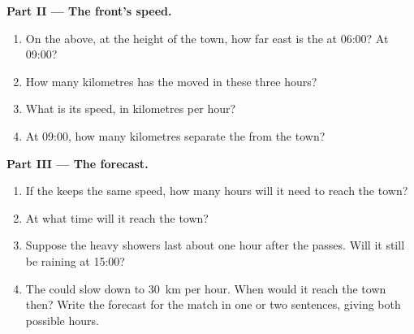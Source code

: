 \begin{problem}
\noindent\textbf{Part II --- The front's speed.}\par\nopagebreak
\begin{enumerate}[resume, beginpenalty=10000]
  \item On the  above, at the height of the town, how far east is the
         at 06:00? At 09:00?
  \item How many kilometres has the  moved in these three hours?
  \item What is its speed, in kilometres per hour?
  \item At 09:00, how many kilometres separate the  from the town?
\end{enumerate}

\noindent\textbf{Part III --- The forecast.}\par\nopagebreak
\begin{enumerate}[resume, beginpenalty=10000]
  \item If the  keeps the same speed, how many hours will it need to
        reach the town?
  \item At what time will it reach the town?
  \item Suppose the heavy showers last about one hour after the 
        passes. Will it still be raining at 15:00?
  \item The  could slow down to \qty{30}{km} per hour. When would it
        reach the town then? Write the forecast for the match in one or
        two sentences, giving both possible hours.
\end{enumerate}
\end{problem}
